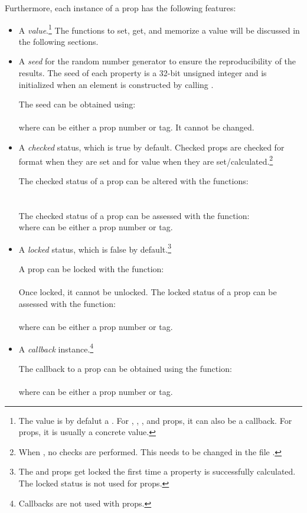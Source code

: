 \documentclass{tufte-handout}
\begin{document}
Furthermore, each instance of a prop has the following features:
\begin{itemize}

\item A \emph{value}.\footnote{The value is by defalut a . For , , , and  props, it can also be a callback. For  props, it is usually a concrete value.}
	The functions to set, get, and memorize a value will be discussed in the following sections.
	
\item A \emph{seed} for the random number generator to ensure the reproducibility of the results. 
	The seed of each property is a 32-bit unsigned integer and is initialized when an element is constructed by calling .
	
	The seed can be obtained using:\\
	\\
	where  can be either a prop number or tag.
	It cannot be changed.
 	
\item A \emph{checked} status, which is true by default.
	Checked props are checked for format when they are set and for value when they are set/calculated.\footnote{When , no checks are performed. This needs to be changed in the file .}
	
	The checked status of a prop can be altered with the functions:\\
	\\
	\\
	The checked status of a prop can be assessed with the function:
	\\
	where  can be either a prop number or tag.
	
\item A \emph{locked} status, which is false by default.\footnote{The  and  props get locked the first time a  property is successfully calculated. The locked status is not used for  props.}
	
	A prop can be locked with the function:\\
	\\
	Once locked, it cannot be unlocked.
	The locked status of a prop can be assessed with the function:\\
	\\
	where  can be either a prop number or tag.
	
\item A \emph{callback} instance.\footnote{Callbacks are not used with  props.}
	
	The callback to a prop can be obtained using the function:\\
	\\
	where  can be either a prop number or tag.
	
\end{itemize}
\end{document}
